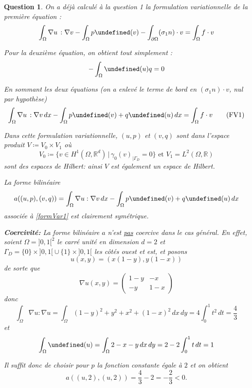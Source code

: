 \documentclass{article}
\newcommand{\RR}{\mathbb R}
\theoremstyle{plain}
\newtheorem{ques}{Question}
\let\div\undefined
\DeclareMathOperator{\div}{div}
\begin{document}
\begin{ques}
On a déjà calculé à la question 1 la formulation variationnelle de la première équation :
\[
    \int_\Omega \nabla u\,:\nabla v - \int_\Omega p\div(v) - \int_{\partial\Omega} (\sigma_1 n) \cdot v
    = \int_\Omega f\cdot v
\]

Pour la deuxième équation, on obtient tout simplement :
\[
    -\int_\Omega \div(u) q = 0
\]

En sommant les deux équations (on a enlevé le terme de bord en $ (\sigma_1 n) \cdot v $, nul par hypothèse)
\begin{equation}\label{formVar1}
	\int_\Omega \nabla u\,:\nabla v\,dx -\int_\Omega p \div(v) + q \div(u)\,dx
    = \int_\Omega f\cdot v \tag{FV1}
\end{equation}

Dans cette formulation variationnelle, $(u, p)$ et $(v, q)$ sont dans l'espace produit
$
    V \coloneqq V_0 \times V_1
$
où
\[
    V_0 \coloneqq \{v\in H^1(\Omega,\RR^d)\,|\, \gamma_0(v)_{|\Gamma_D} = 0 \}
    \text{ et }
    V_1 = L^2(\Omega,\RR)
\]
sont des espaces de Hilbert: ainsi $V$ est également un espace de Hilbert.

La forme bilinéaire
\[
    a((u,p),(v,q)) = \int_\Omega \nabla u:\nabla v\,dx 
    -\int_\Omega p\div(v) + q\div(u)\,dx
\]
associée à \eqref{formVar1} est clairement symétrique.


\textbf{Coercivité:} La forme bilinéaire $a$ n'est \underline{pas} coercive dans le cas général. En effet, soient $\Omega = { ]0,1[ }^2$ le carré unité en dimension $d=2$ et $\Gamma_D = \{0\} \times { ]0,1[ } \cup \{1\}\times { ]0,1[ } $ les côtés ouest et est, et posons
\[
    u(x,y) = \left(x(1-y), y(1-x) \right)
\]
de sorte que
\[
    \nabla u(x,y) = \begin{pmatrix}
        1-y & -x \\ -y & 1-x
    \end{pmatrix}
\]
donc
\[
    \int_\Omega \nabla u:\nabla u = 
    \int_\Omega (1-y)^2+y^2+ x^2+(1-x)^2\,dx\,dy
    = 4\int_0^1 t^2\,dt = \frac 43
\]
et \[
    \int_\Omega \div(u) = \int_\Omega 2-x-y\,dx\,dy = 2 - 2\int_0^1 t\,dt = 1
\]

Il suffit donc de choisir pour $p$ la fonction constante égale à $2$ et on obtient
\[
    a((u,2),(u,2)) = \frac 43 - 2 = -\frac 23 < 0.
\]

\end{ques}
\end{document}
